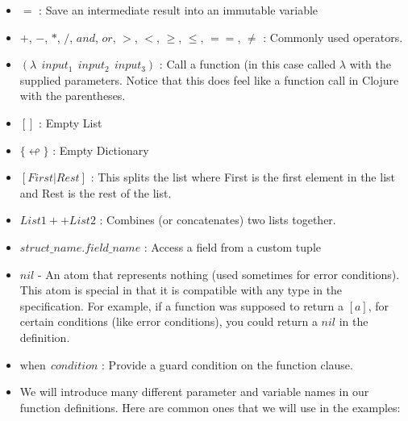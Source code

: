 \documentclass[
]{book}
\providecommand{\tightlist}{%
  \setlength{\itemsep}{0pt}\setlength{\parskip}{0pt}}
\begin{document}
\begin{formulabox}

\begin{itemize}
\tightlist
\item
  \(=\) : Save an intermediate result into an immutable variable
\item
  \(+\), \(-\), \(*\), \(/\), \(and\), \(or\), \(>\), \(<\), \(\geq\), \(\leq\), \(==\), \(\not=\) : Commonly used operators.
\item
  \((\lambda ~ ~ input_1 ~ ~ input_2 ~ ~ input_3)\) : Call a function (in this case called \(\lambda\) with the supplied parameters. Notice that this does feel like a function call in Clojure with the parentheses.
\item
  \([]\) : Empty List
\item
  \(\lbrace \looparrowleft \rbrace\) : Empty Dictionary
\item
  \([First|Rest]\) : This splits the list where First is the first element in the list and Rest is the rest of the list.
\item
  \(List1 ++ List2\) : Combines (or concatenates) two lists together.
\item
  \(struct\_name.field\_name\) : Access a field from a custom tuple
\item
  \(nil\) - An atom that represents nothing (used sometimes for error conditions). This atom is special in that it is compatible with any type in the specification. For example, if a function was supposed to return a \([a]\), for certain conditions (like error conditions), you could return a \(nil\) in the definition.
\item
  \(\text{when} ~ ~ condition\) : Provide a guard condition on the function clause.
\item
  We will introduce many different parameter and variable names in our function definitions. Here are common ones that we will use in the examples:


\end{itemize}
\end{formulabox}
\end{document}
